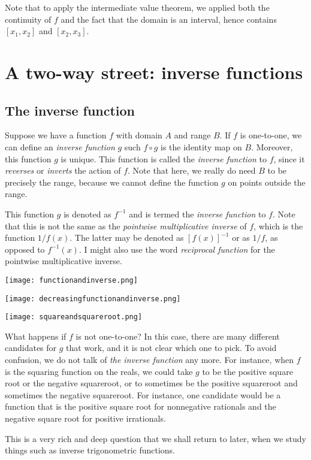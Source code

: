 \documentclass[10pt]{amsart}
\begin{document}
Note that to apply the intermediate value theorem, we applied both the
continuity of $f$ and the fact that the domain is an interval, hence
contains $[x_1,x_2]$ and $[x_2,x_3]$.

\section{A two-way street: inverse functions}

\subsection{The inverse function}

Suppose we have a function $f$ with domain $A$ and range $B$. If $f$
is one-to-one, we can define an {\em inverse function} $g$ such $f
\circ g$ is the identity map on $B$. Moreover, this function $g$ is
unique. This function is called the {\em inverse function} to $f$,
since it {\em reverses} or {\em inverts} the action of $f$. Note that
here, we really do need $B$ to be precisely the range, because we
cannot define the function $g$ on points outside the range.

This function $g$ is denoted as $f^{-1}$ and is termed the {\em
inverse function} to $f$. Note that this is not the same as the {\em
pointwise multiplicative inverse} of $f$, which is the function
$1/f(x)$. The latter may be denoted as $[f(x)]^{-1}$ or as $1/f$, as
opposed to $f^{-1}(x)$. I might also use the word {\em reciprocal
function} for the pointwise multiplicative inverse.

\texttt{[image: functionandinverse.png]}

\texttt{[image: decreasingfunctionandinverse.png]}

\texttt{[image: squareandsquareroot.png]}

What happens if $f$ is not one-to-one? In this case, there are many
different candidates for $g$ that work, and it is not clear which one
to pick. To avoid confusion, we do not talk of {\em the inverse
function} any more. For instance, when $f$ is the squaring function on
the reals, we could take $g$ to be the positive square root or the
negative squareroot, or to sometimes be the positive squareroot and
sometimes the negative squareroot. For instance, one candidate would
be a function that is the positive square root for nonnegative
rationals and the negative square root for positive irrationals.

This is a very rich and deep question that we shall return to later,
when we study things such as inverse trigonometric functions.
\end{document}

